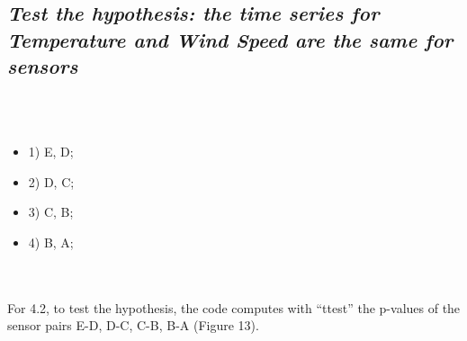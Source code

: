 \documentclass[a4paper,12pt]{article} %
\begin{document}
\subsection{\it Test the hypothesis: the time series for Temperature and Wind Speed are the same for sensors}
\\\\ 
\begin{itemize}
\item {1) E, D;}\\
\item {2) D, C;}\\
\item {3) C, B;}\\
\item {4) B, A;}\\
\end{itemize}
\\\\
For 4.2, to test the hypothesis, the code computes with “ttest” the p-values of
the sensor pairs E-D, D-C, C-B, B-A (Figure 13). 
\\\\
\end{document}
